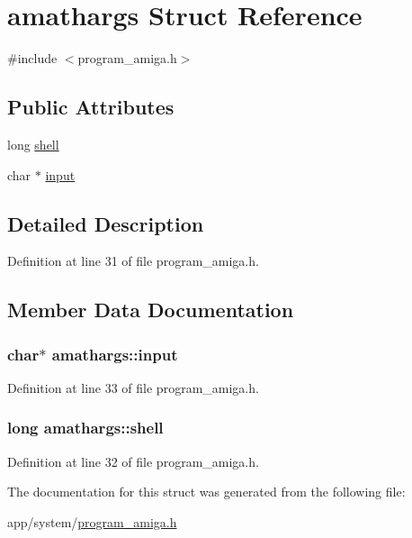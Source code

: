 \hypertarget{structamathargs}{}\section{amathargs Struct Reference}
\label{structamathargs}


{\ttfamily \#include $<$program\+\_\+amiga.\+h$>$}

\subsection*{Public Attributes}
\begin{DoxyCompactItemize}
\item 
long \hyperlink{structamathargs_a13baf6e4bcb57a301c2bb4bc36a8cbcb}{shell}
\item 
char $\ast$ \hyperlink{structamathargs_a78f3b2e3123c64b4f1ff646c1bacac2c}{input}
\end{DoxyCompactItemize}


\subsection{Detailed Description}


Definition at line 31 of file program\+\_\+amiga.\+h.



\subsection{Member Data Documentation}
\subsubsection[{\texorpdfstring{input}{input}}]{\setlength{\rightskip}{0pt plus 5cm}char$\ast$ amathargs\+::input}\hypertarget{structamathargs_a78f3b2e3123c64b4f1ff646c1bacac2c}{}\label{structamathargs_a78f3b2e3123c64b4f1ff646c1bacac2c}


Definition at line 33 of file program\+\_\+amiga.\+h.

\subsubsection[{\texorpdfstring{shell}{shell}}]{\setlength{\rightskip}{0pt plus 5cm}long amathargs\+::shell}\hypertarget{structamathargs_a13baf6e4bcb57a301c2bb4bc36a8cbcb}{}\label{structamathargs_a13baf6e4bcb57a301c2bb4bc36a8cbcb}


Definition at line 32 of file program\+\_\+amiga.\+h.



The documentation for this struct was generated from the following file\+:\begin{DoxyCompactItemize}
\item 
app/system/\hyperlink{program__amiga_8h}{program\+\_\+amiga.\+h}\end{DoxyCompactItemize}
